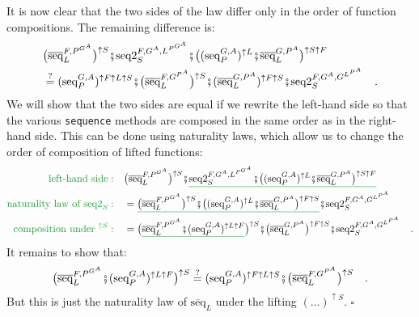 It is now clear that the two sides of the law differ only in the order
of function compositions. The remaining difference is:
\begin{align*}
 & \big(\overline{\text{seq}}_{L}^{F,P^{G^{A}}}\big)^{\uparrow S}\bef\text{seq2}_{S}^{F,G^{A},L^{P^{G^{A}}}}\bef\big((\text{seq}_{P}^{G,A})^{\uparrow L}\bef\overline{\text{seq}}_{L}^{G,P^{A}}\big)^{\uparrow S\uparrow F}\\
 & \overset{?}{=}(\text{seq}_{P}^{G,A})^{\uparrow F\uparrow L\uparrow S}\bef\big(\overline{\text{seq}}_{L}^{F,G^{P^{A}}}\big)^{\uparrow S}\bef(\overline{\text{seq}}_{L}^{G,P^{A}})^{\uparrow F\uparrow S}\bef\text{seq2}_{S}^{F,G^{A},G^{L^{P^{A}}}}\quad.
\end{align*}
We will show that the two sides are equal if we rewrite the left-hand
side so that the various \lstinline!sequence! methods are composed
in the same order as in the right-hand side. This can be done using
naturality laws, which allow us to change the order of composition
of lifted functions:
\begin{align*}
{\color{greenunder}\text{left-hand side}:}\quad & \big(\overline{\text{seq}}_{L}^{F,P^{G^{A}}}\big)^{\uparrow S}\bef\gunderline{\text{seq2}_{S}^{F,G^{A},L^{P^{G^{A}}}}\bef\big((\text{seq}_{P}^{G,A})^{\uparrow L}\bef\overline{\text{seq}}_{L}^{G,P^{A}}\big)^{\uparrow S\uparrow F}}\\
{\color{greenunder}\text{naturality law of }\text{seq2}_{S}:}\quad & =\gunderline{\big(\overline{\text{seq}}_{L}^{F,P^{G^{A}}}\big)^{\uparrow S}\bef\big((\text{seq}_{P}^{G,A})^{\uparrow L}\bef\overline{\text{seq}}_{L}^{G,P^{A}}\big)^{\uparrow F\uparrow S}}\bef\text{seq2}_{S}^{F,G^{A},G^{L^{P^{A}}}}\\
{\color{greenunder}\text{composition under }^{\uparrow S}:}\quad & =\big(\gunderline{\overline{\text{seq}}_{L}^{F,P^{G^{A}}}\bef(\text{seq}_{P}^{G,A})^{\uparrow L\uparrow F}}\big)^{\uparrow S}\bef\big(\overline{\text{seq}}_{L}^{G,P^{A}}\big)^{\uparrow F\uparrow S}\bef\text{seq2}_{S}^{F,G^{A},G^{L^{P^{A}}}}\quad.
\end{align*}
It remains to show that: 
\[
\big(\overline{\text{seq}}_{L}^{F,P^{G^{A}}}\bef(\text{seq}_{P}^{G,A})^{\uparrow L\uparrow F}\big)^{\uparrow S}\overset{?}{=}(\text{seq}_{P}^{G,A})^{\uparrow F\uparrow L\uparrow S}\bef\big(\overline{\text{seq}}_{L}^{F,G^{P^{A}}}\big)^{\uparrow S}\quad.
\]
But this is just the naturality law of $\overline{\text{seq}}_{L}$
under the lifting $(\dots)^{\uparrow S}$. $\square$


